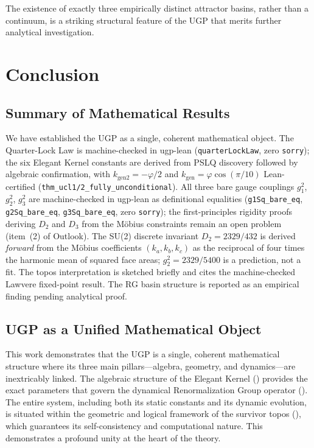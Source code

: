 \documentclass[11pt,twocolumn]{article}
\begin{document}
The existence of exactly three empirically distinct attractor basins, rather than a continuum, is a striking structural feature of the UGP that merits further analytical investigation.

\section{Conclusion}

\subsection{Summary of Mathematical Results}
We have established the UGP as a single, coherent mathematical object. The Quarter-Lock Law is machine-checked in ugp-lean (\texttt{quarterLockLaw}, zero \texttt{sorry}); the six Elegant Kernel constants are derived from PSLQ discovery followed by algebraic confirmation, with $k_{\mathrm{gen2}} = -\varphi/2$ and $k_{\mathrm{gen}} = \varphi\cos(\pi/10)$ Lean-certified (\texttt{thm\_ucl1/2\_fully\_unconditional}). All three bare gauge couplings $g_1^2$, $g_2^2$, $g_3^2$ are machine-checked in ugp-lean as definitional equalities (\texttt{g1Sq\_bare\_eq}, \texttt{g2Sq\_bare\_eq}, \texttt{g3Sq\_bare\_eq}, zero \texttt{sorry}); the first-principles rigidity proofs deriving $D_2$ and $D_3$ from the Möbius constraints remain an open problem (item~(2) of Outlook). The SU(2) discrete invariant $D_2 = 2329/432$ is derived \emph{forward} from the Möbius coefficients $(k_a, k_b, k_c)$ as the reciprocal of four times the harmonic mean of squared face areas; $g_2^2 = 2329/5400$ is a prediction, not a fit. The topos interpretation is sketched briefly and cites the machine-checked Lawvere fixed-point result. The RG basin structure is reported as an empirical finding pending analytical proof.

\subsection{UGP as a Unified Mathematical Object}
This work demonstrates that the UGP is a single, coherent mathematical structure where its three main pillars—algebra, geometry, and dynamics—are inextricably linked. The algebraic structure of the Elegant Kernel () provides the exact parameters that govern the dynamical Renormalization Group operator (). The entire system, including both its static constants and its dynamic evolution, is situated within the geometric and logical framework of the survivor topos (), which guarantees its self-consistency and computational nature. This demonstrates a profound unity at the heart of the theory.
\end{document}

